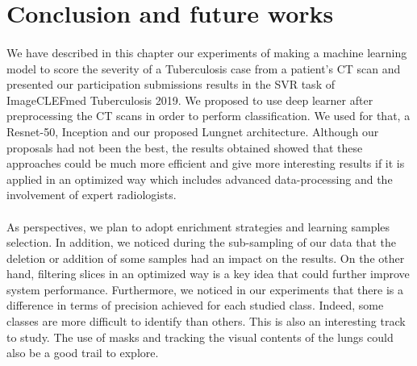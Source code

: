 \section{Conclusion and future works}
\paragraph{}
We have described in this chapter our experiments of making a machine learning model to score the severity of a Tuberculosis case from a patient's CT scan and presented our participation submissions results in the SVR task of ImageCLEFmed Tuberculosis 2019. We proposed to use deep learner after preprocessing the CT scans in order to perform classification. We used for that, a Resnet-50, Inception and our proposed Lungnet architecture. Although our proposals had not been the best, the results obtained showed that these approaches could be much more efficient and give more interesting results if it is applied in an optimized way which includes advanced data-processing and the involvement of expert radiologists.
\paragraph{}
As perspectives, we plan to adopt enrichment strategies and learning samples selection. In addition, we noticed during the sub-sampling of our data that the deletion or addition of some samples had an impact on the results. On the other hand, filtering slices in an optimized way is a key idea that could further improve system performance. Furthermore, we noticed in our experiments that there is a difference in terms of precision achieved for each studied class. Indeed, some classes are more difficult to identify than others. This is also an interesting track to study. The use of masks and tracking the visual contents of the lungs could also be a good trail to explore.



